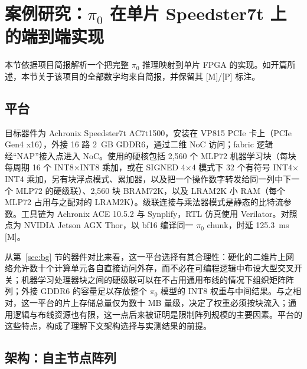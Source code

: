\documentclass[a4paper,10.5pt]{ctexart}
\newcommand{\tM}{\textsf{[M]}}              %
\newcommand{\tP}{\textsf{[P]}}              %
\newcommand{\pizero}{$\pi_0$}
\begin{document}
\section{案例研究：\texorpdfstring{\pizero{}}{pi0} 在单片 Speedster7t 上的端到端实现}\label{sec:case}

本节依据项目简报解析一个把完整 \pizero{} 推理映射到单片 FPGA 的实现。如开篇所述，本节关于该项目的全部数字均来自简报，并保留其 \tM/\tP{} 标注。

\subsection{平台}

目标器件为 Achronix Speedster7t AC7t1500，安装在 VP815 PCIe 卡上（PCIe Gen4 x16），外接 16 路 2~GB GDDR6，通过二维 NoC 访问；fabric 逻辑经“NAP”接入点进入 NoC。使用的硬核包括 2,560 个 MLP72 机器学习块（每块每周期 16 个 INT8$\times$INT8 乘加，或在 SIGNED 4$\times$4 模式下 32 个有符号 INT4$\times$INT4 乘加，另有块浮点模式、累加器，以及把一个操作数字转发给同一列中下一个 MLP72 的硬级联）、2,560 块 BRAM72K，以及 LRAM2K 小 RAM（每个 MLP72 占用与之配对的 LRAM2K）。级联连接与乘法器模式是静态的比特流参数。工具链为 Achronix ACE 10.5.2 与 Synplify，RTL 仿真使用 Verilator。对照点为 NVIDIA Jetson AGX Thor，以 bf16 编译同一 \pizero{} chunk，时延 125.3~ms \tM。

从第~\ref{sec:bg} 节的器件对比来看，这一平台选择有其合理性：硬化的二维片上网络允许数十个计算单元各自直接访问外存，而不必在可编程逻辑中布设大型交叉开关；机器学习处理器块之间的硬级联可以在不占用通用布线的情况下组织矩阵阵列；外接 GDDR6 的容量足以存放整个 \pizero{} 模型的 INT8 权重与中间结果。与之相对，这一平台的片上存储总量仅为数十 MB 量级，决定了权重必须按块流入；通用逻辑与布线资源也有限，这一点后来被证明是限制阵列规模的主要因素。平台的这些特点，构成了理解下文架构选择与实测结果的前提。

\subsection{架构：自主节点阵列}
\end{document}
